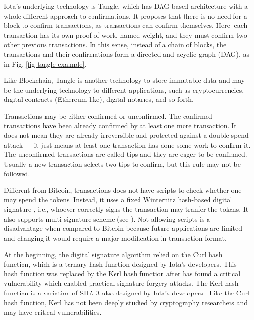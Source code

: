 Iota's underlying technology is Tangle, which has DAG-based architecture with a whole different approach to confirmations. It proposes that there is no need for a block to confirm transactions, as transactions can confirm themselves. Here, each transaction has its own proof-of-work, named weight, and they must confirm two other previous transactions. In this sense, instead of a chain of blocks, the transactions and their confirmations form a directed and acyclic graph (DAG), as in Fig. \ref{fig-tangle-example}.

Like Blockchain, Tangle is another technology to store immutable data and may be the underlying technology to different applications, such as cryptocurrencies, digital contracts (Ethereum-like), digital notaries, and so forth.

Transactions may be either confirmed or unconfirmed. The confirmed transactions have been already confirmed by at least one more transaction. It does not mean they are already irreversible and protected against a double spend attack --- it just means at least one transaction has done some work to confirm it. The unconfirmed transactions are called tips and they are eager to be confirmed. Usually a new transaction selects two tips to confirm, but this rule may not be followed.

Different from Bitcoin, transactions does not have scripts to check whether one may spend the tokens. Instead, it uses a fixed Winternitz hash-based digital signature \citep{dods2005hash}, i.e., whoever correctly signs the transaction may tranfer the tokens. It also supports multi-signature scheme (see \cite{iotamultisign}). Not allowing scripts is a disadvantage when compared to Bitcoin because future applications are limited and changing it would require a major modification in transaction format.

At the beginning, the digital signature algorithm relied on the Curl hash function, which is a ternary hash function designed by Iota's developers. This hash function was replaced by the Kerl hash function after \cite{heilman2017iota} has found a critical vulnerability which enabled practical signature forgery attacks. The Kerl hash function is a variation of SHA-3 also designed by Iota's developers \citep{iotakerl}. Like the Curl hash function, Kerl has not been deeply studied by cryptography researchers and may have critical vulnerabilities.

